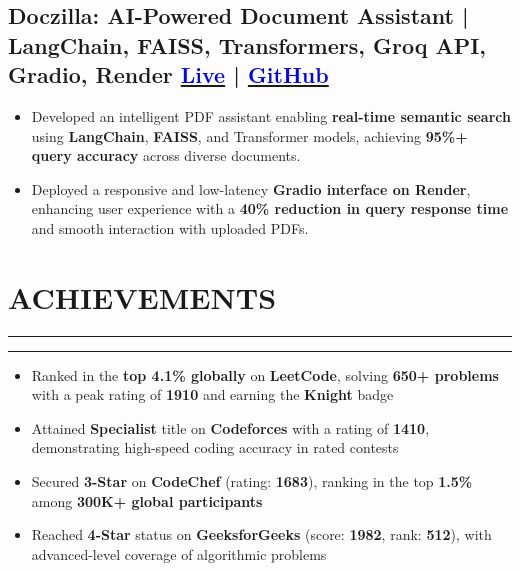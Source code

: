 \documentclass[a4paper]{article}
\newcommand{\verticalInd}{
   \vspace{-0.9em} %
    \noindent\rule{\textwidth}{0pt}
    \vspace{0em} %
}
\newcommand{\sectionlineP}{
   \vspace{-2em} %
    \noindent\rule{\textwidth}{0.4pt}
    \vspace{-2em} %
}
\begin{document}
\vspace{-1.5em}

\subsection*{
  \textbf{Doczilla: AI-Powered Document Assistant | LangChain, FAISS, Transformers, Groq API, Gradio, Render}
  \hfill 
  \textnormal{
  \href{https://pdf-chatbot-gkcz.onrender.com/}{\textcolor{blue}{Live}} |
  \href{https://github.com/aakash811/PDF-chatbot}{\textcolor{blue}{GitHub}}
}}
\vspace{-0.5em}
\begin{itemize}[leftmargin=*]
    \item Developed an intelligent PDF assistant enabling \textbf{real-time semantic search} using \textbf{LangChain}, \textbf{FAISS}, and Transformer models, achieving \textbf{95\%+ query accuracy} across diverse documents.
    \vspace{-0.5em}
    \item Deployed a responsive and low-latency \textbf{Gradio interface on Render}, enhancing user experience with a \textbf{40\% reduction in query response time} and smooth interaction with uploaded PDFs.
\end{itemize}

\vspace{-1.25em}

\section*{ACHIEVEMENTS}
\sectionlineP
\verticalInd
\begin{itemize}[leftmargin=*]
    \item Ranked in the \textbf{top 4.1\% globally} on \textbf{LeetCode}, solving \textbf{650+ problems} with a peak rating of \textbf{1910} and earning the \textbf{Knight} badge
    \vspace{-0.5em}
    
    \item Attained \textbf{Specialist} title on \textbf{Codeforces} with a rating of \textbf{1410}, demonstrating high-speed coding accuracy in rated contests
    \vspace{-0.5em}
    
    \item Secured \textbf{3-Star} on \textbf{CodeChef} (rating: \textbf{1683}), ranking in the top \textbf{1.5\%} among \textbf{300K+ global participants}
    \vspace{-0.5em}
    
    \item Reached \textbf{4-Star} status on \textbf{GeeksforGeeks} (score: \textbf{1982}, rank: \textbf{512}), with advanced-level coverage of algorithmic problems
\end{itemize}
\end{document}

